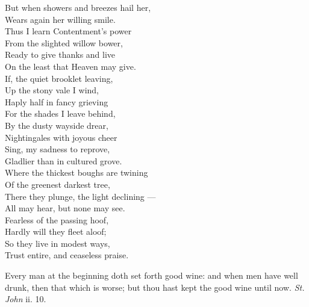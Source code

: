  But when showers and breezes hail her, \\
 Wears again her willing smile. \\
 Thus I learn Contentment’s power \\
 From the slighted willow bower, \\
 Ready to give thanks and live \\
 On the least that Heaven may give. \\
  If, the quiet brooklet leaving, \\
 Up the stony vale I wind, \\
 Haply half in fancy grieving \\
 For the shades I leave behind, \\
 By the dusty wayside drear, \\
 Nightingales with joyous cheer \\
 Sing, my sadness to reprove, \\
 Gladlier than in cultured grove. \\
  Where the thickest boughs are twining \\
 Of the greenest darkest tree, \\
 There they plunge, the light declining — \\
 All may hear, but none may see. \\
 Fearless of the passing hoof, \\
 Hardly will they fleet aloof; \\
 So they live in modest ways, \\
 Trust entire, and ceaseless praise.\\


Every man at the beginning doth set forth good wine: and when men have well drunk, then that which is worse; but thou hast kept the good wine until now. \emph{St. John} ii. 10.

